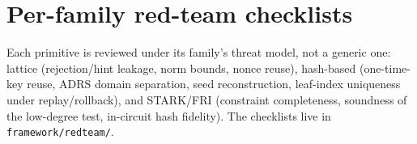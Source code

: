 \documentclass[11pt]{article}
\begin{document}
\section{Per-family red-team checklists}
Each primitive is reviewed under its family's threat model, not a generic one:
lattice (rejection/hint leakage, norm bounds, nonce reuse), hash-based
(one-time-key reuse, ADRS domain separation, seed reconstruction, leaf-index
uniqueness under replay/rollback), and STARK/FRI (constraint completeness,
soundness of the low-degree test, in-circuit hash fidelity). The checklists
live in \texttt{framework/redteam/}.
\end{document}
